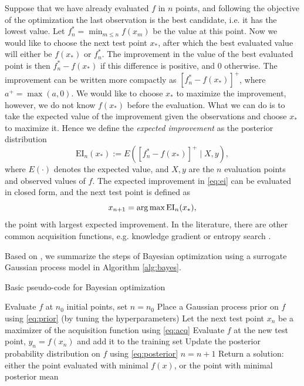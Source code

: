 Suppose that we have already evaluated $f$ in $n$ points, and following the objective of the optimization the last observation is the best candidate, i.e. it has the lowest value. Let $f_n^* = \min_{m\leq n}f(x_m)$ be the value at this point. Now we would like to choose the next test point $x_*$, after which the best evaluated value will either be $f(x_*)$ or $f_n^*$. The improvement in the value of the best evaluated point is then $f_n^*-f(x_*)$ if this difference is positive, and 0 otherwise. The improvement can be written more compactly as $[f_n^*-f(x_*)]^+$, where $a^+=\max(a,0)$. We would like to choose $x_*$ to maximize the improvement, however, we do not know $f(x_*)$ before the evaluation. What we can do is to take the expected value of the improvement given the observations and choose $x_*$ to maximize it. Hence we define the \textit{expected improvement} as the posterior distribution
\begin{equation}\label{eq:ei}
    \mathrm{EI}_n(x_*):=E\left([f_n^*-f(x_*)]^+ \mid X,y\right),
\end{equation}
where $E(\cdot)$ denotes the expected value, and $X,y$ are the $n$ evaluation points and observed values of $f$. The expected improvement in \eqref{eq:ei} can be evaluated in closed form, and the next test point is defined as
\begin{equation}\label{eq:acq}
    x_{n+1} = \operatorname*{arg\,max}\mathrm{EI}_n(x_*),
\end{equation}
the point with largest expected improvement. In the literature, there are other common acquisition functions, e.g. knowledge gradient or entropy search \cite{frazier2018tutorial}.

Based on \cite{frazier2018tutorial}, we summarize the steps of Bayesian optimization using a surrogate Gaussian process model in Algorithm \ref{alg:bayes}.
\begin{algorithm}
\caption{Basic pseudo-code for Bayesian optimization}
\label{alg:bayes}
\begin{algorithmic}[1]
    \State Evaluate $f$ at $n_0$ initial points, set $n=n_0$
    \State Place a Gaussian process prior on $f$ using \eqref{eq:prior} (by tuning the hyperparameters)
    \State Let the next test point $x_n$ be a maximizer of the acquisition function using \eqref{eq:acq} %
    \State Evaluate $f$ at the new test point, $y_n = f(x_n)$ and add it to the training set
     \State Update the posterior probability distribution on $f$ using \eqref{eq:posterior}
    \State $n=n+1$
	\EndWhile
	\State Return a solution: either the point evaluated with minimal $f(x)$, or the point with minimal posterior mean
\end{algorithmic}
\end{algorithm}


